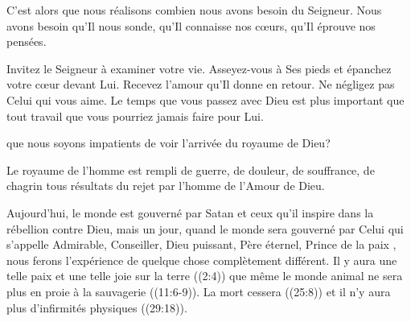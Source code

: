 C'est alors que nous réalisons combien nous avons besoin du Seigneur.
 Nous avons besoin qu'Il nous sonde, qu'Il connaisse nos c\oe{}urs,
 qu'Il éprouve nos pensées.

Invitez le Seigneur à examiner votre vie. Asseyez-vous à Ses pieds
 et épanchez votre c\oe{}ur devant Lui.
 Recevez l'amour qu'Il donne en retour. Ne négligez pas Celui qui vous aime.
 Le temps que vous passez avec Dieu est plus important
 que tout travail que vous pourriez jamais faire pour Lui.

\dvrule







 que nous soyons impatients
 de voir l'arrivée du royaume de Dieu? 

Le royaume de l'homme est rempli de guerre, de douleur, de souffrance,
 de chagrin \ocadr tous résultats du rejet par l'homme de l'Amour de Dieu. 


Aujourd'hui, le monde est gouverné par Satan et ceux qu'il inspire
 dans la rébellion contre Dieu, mais un jour, quand le monde sera gouverné
 par Celui qui s'appelle \og Admirable, Conseiller, Dieu puissant,
 Père éternel, Prince de la paix \fg{}, 
 nous ferons l'expérience de quelque chose complètement différent.
 Il y aura une telle paix et une telle joie sur la terre ((2:4))
 que même le monde animal ne sera plus en proie à la sauvagerie
 ((11:6-9)).
 La mort cessera ((25:8))
 et il n'y aura plus d'infirmités physiques ((29:18)). 

